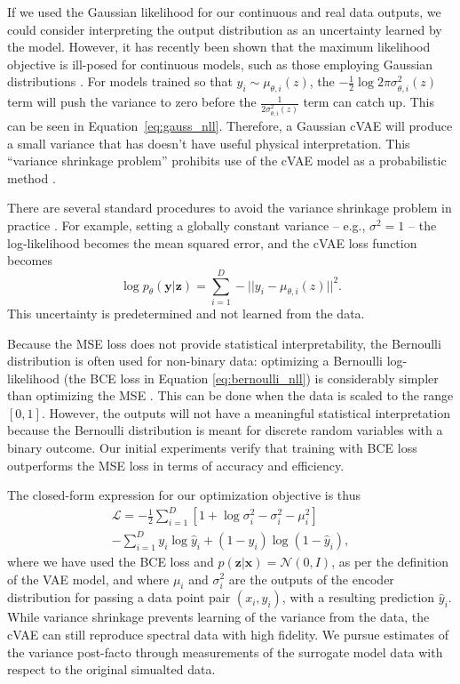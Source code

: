 \documentclass[fleqn,usenatbib,useAMS]{mnras}
\begin{document}
If we used the Gaussian likelihood for our continuous and real data outputs, we could consider interpreting the output distribution as an uncertainty learned by the model.
However, it has recently been shown that the maximum likelihood objective is ill-posed for continuous models, such as those employing Gaussian distributions \citep{matteiLeveragingExactLikelihood2018}.
For models trained so that $y_i\sim\mu_{\theta, i}(z)$, the $-\frac{1}{2} \log 2 \pi \sigma_{\theta, i}^2(z)$ term will push the variance to zero before the $\frac{1}{2 \sigma_{\theta, i}^2(z)}$ term can catch up.
This can be seen in Equation~\ref{eq:gauss_nll}. 
Therefore, a Gaussian cVAE will produce a small variance that has doesn't have useful physical interpretation.
This ``variance shrinkage problem'' prohibits use of the cVAE model as a probabilistic method  \citep{matteiLeveragingExactLikelihood2018, detlefsenReliableTrainingEstimation2019}.

There are several standard procedures to avoid the variance shrinkage problem in practice \citep{detlefsenReliableTrainingEstimation2019}.
For example, setting a globally constant variance -- e.g., $\sigma^2 = 1$ -- the log-likelihood becomes the mean squared error, and the cVAE loss function becomes
\begin{equation}
    \log p_{\theta}(\mathbf{y | \mathbf{z}}) = \sum_{i=1}^{D}  -|| y_i - \mu_{\theta, i}(z) ||^2. 
\end{equation}
This uncertainty is predetermined and not learned from the data. 

Because the MSE loss does not provide statistical interpretability, the Bernoulli distribution is often used for non-binary data: optimizing a Bernoulli log-likelihood (the BCE loss in Equation \ref{eq:bernoulli_nll}) is considerably simpler than optimizing the MSE \citep{detlefsenReliableTrainingEstimation2019}.
This can be done when the data is scaled to the range $[0,1]$.
However, the outputs will not have a meaningful statistical interpretation because the Bernoulli distribution is meant for discrete random variables with a binary outcome.
Our initial experiments verify that training with BCE loss outperforms the MSE loss in terms of accuracy and efficiency. 

The closed-form expression for our optimization objective is thus
\begin{multline}
\mathcal{L} = -\frac{1}{2}\sum_{i=1}^{D}\left[ 1 + \log \sigma_i^2  - \sigma_i^2 - \mu_i^2 \right]\\ -\sum_{i=1}^{D}  y_i \log \hat{y}_i+ (1-y_i)\log (1-\hat{y}_i),
\label{eq:exact_objective}
\end{multline}
\noindent where we have used the BCE loss and  $p(\mathbf{z}|\mathbf{x}) = \mathcal{N}(0, I)$, as per the definition of the VAE model, and  where $\mu_i$ and $\sigma^2_i$ are the outputs of the encoder distribution for passing a data point pair $(x_i, y_i)$, with a resulting prediction $\hat{y}_i$.
While variance shrinkage prevents learning of the variance from the data, the cVAE can still reproduce spectral data with high fidelity.
We pursue estimates of the variance post-facto through measurements of the surrogate model data with respect to the original simualted data.
\end{document}
